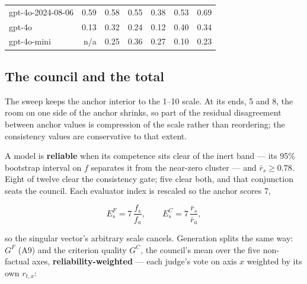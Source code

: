 \documentclass{article}
\begin{document}
\begin{table}[H]
\begin{center}
{\begin{tabular}{@{}lrrrrrr@{}}
gpt-4o-2024-08-06 &\cellcolor[HTML]{279BC1}\textcolor[HTML]{EEF3F8}{0.59}&\cellcolor[HTML]{2A9EC1}\textcolor[HTML]{EEF3F8}{0.58}&\cellcolor[HTML]{33A7C2}\textcolor[HTML]{EEF3F8}{0.55}&\cellcolor[HTML]{7DCCBB}\textcolor[HTML]{1A1A1A}{0.38}&\cellcolor[HTML]{38ADC3}\textcolor[HTML]{1A1A1A}{0.53}&\cellcolor[HTML]{2076B4}\textcolor[HTML]{EEF3F8}{0.69} \\
gpt-4o &\cellcolor[HTML]{EBF7B1}\textcolor[HTML]{1A1A1A}{0.13}&\cellcolor[HTML]{9FD9B8}\textcolor[HTML]{1A1A1A}{0.32}&\cellcolor[HTML]{CAEAB4}\textcolor[HTML]{1A1A1A}{0.24}&\cellcolor[HTML]{EEF8B3}\textcolor[HTML]{1A1A1A}{0.12}&\cellcolor[HTML]{73C8BD}\textcolor[HTML]{1A1A1A}{0.40}&\cellcolor[HTML]{93D5B9}\textcolor[HTML]{1A1A1A}{0.34} \\
gpt-4o-mini & n/a &\cellcolor[HTML]{C7E9B4}\textcolor[HTML]{1A1A1A}{0.25}&\cellcolor[HTML]{88D0BA}\textcolor[HTML]{1A1A1A}{0.36}&\cellcolor[HTML]{BBE5B5}\textcolor[HTML]{1A1A1A}{0.27}&\cellcolor[HTML]{F1F9B9}\textcolor[HTML]{1A1A1A}{0.10}&\cellcolor[HTML]{CDEBB4}\textcolor[HTML]{1A1A1A}{0.23} \\
\bottomrule
\end{tabular}}
\end{center}
\end{table}

\subsection{The council and the total}\label{the-council-and-the-total}

The sweep keeps the anchor interior to the 1--10 scale. At its ends, 5 and 8, the room on one side of the anchor shrinks, so part of the residual disagreement between anchor values is compression of the scale rather than reordering; the consistency values are conservative to that extent.

A model is \textbf{reliable} when its competence sits clear of the inert band --- its 95\% bootstrap interval on \(f\) separates it from the near-zero cluster --- and \(\bar r_s\ge0.78\). Eight of twelve clear the consistency gate; five clear both, and that conjunction seats the council. Each evaluator index is rescaled so the anchor scores 7,

\[ E^{F}_s=7\,\frac{f_s}{f_a},\qquad E^{C}_s=7\,\frac{\bar r_s}{\bar r_a}, \tag{A12}\]

so the singular vector's arbitrary scale cancels. Generation splits the same way: \(G^{F}\) (A9) and the criterion quality \(G^{C}\), the council's mean over the five non-factual axes, \textbf{reliability-weighted} --- each judge's vote on axis \(x\) weighted by its own \(r_{t,x}\):
\end{document}
